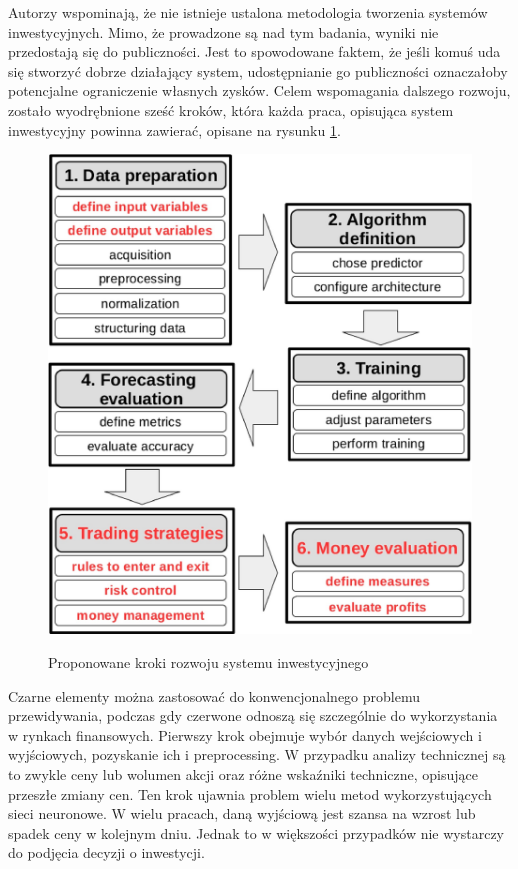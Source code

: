 \documentclass[twoside]{iisthesis}
\begin{document}
Autorzy wspominają, że nie istnieje ustalona metodologia tworzenia systemów inwestycyjnych. Mimo, że prowadzone są nad tym badania, wyniki nie przedostają się do publiczności. Jest to spowodowane faktem, że jeśli komuś uda się stworzyć dobrze działający system, udostępnianie go publiczności oznaczałoby potencjalne ograniczenie własnych zysków. Celem wspomagania dalszego rozwoju, zostało wyodrębnione sześć kroków, która każda praca, opisująca system inwestycyjny powinna zawierać, opisane na rysunku \ref{fig:metodyka}.

\begin{figure}[h]
\caption{Proponowane kroki rozwoju systemu inwestycyjnego}
\centering
\includegraphics{metodyka.jpg}
\label{fig:metodyka}
\end{figure}

Czarne elementy można zastosować do konwencjonalnego problemu przewidywania, podczas gdy czerwone odnoszą się szczególnie do wykorzystania w rynkach finansowych. Pierwszy krok obejmuje wybór danych wejściowych i wyjściowych, pozyskanie ich i preprocessing. W przypadku analizy technicznej są to zwykle ceny lub wolumen akcji oraz różne wskaźniki techniczne, opisujące przeszłe zmiany cen. Ten krok ujawnia problem wielu metod wykorzystujących sieci neuronowe. W wielu pracach, daną wyjściową jest szansa na wzrost lub spadek ceny w kolejnym dniu. Jednak to w większości przypadków nie wystarczy do podjęcia decyzji o inwestycji.
\end{document}
